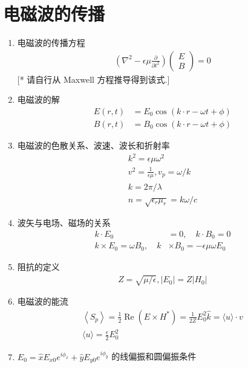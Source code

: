 \documentclass[../../note.tex]{subfiles}
\begin{document}
\section{电磁波的传播}
\begin{enumerate}
	\item 电磁波的传播方程
	\begin{align}
	\left(\nabla^2-\epsilon \mu \frac{\partial}{\partial t^2}\right)\left(\begin{array}{l}
		E \\
		B
	\end{array}\right)=0
	\end{align}
	[* 请自行从 Maxwell 方程推导得到该式.]
		\item 电磁波的解
	\begin{align}
		E(r, t) & ={E}_0 \cos (k \cdot r-\omega t+\phi) \\
		B(r, t) & =B_0 \cos (k \cdot r-\omega t+\phi)
	\end{align}
		\item 电磁波的色散关系、波速、波长和折射率
	\begin{align}
		k^2=\epsilon \mu \omega^2 \\
		v^2=\frac{1}{\epsilon \mu}, v_p=\omega / k \\
		k=2 \pi / \lambda \\
		n=\sqrt{\epsilon_r \mu_r}=k \omega / c
	\end{align}
	
	\item 波矢与电场、磁场的关系
	\begin{align}
		k \cdot {E}_0 & =0, \quad k \cdot B_0=0 \\
		k \times {E}_0=\omega {B}_0, \quad k & \times B_0=-\epsilon \mu \omega {E}_0
	\end{align}
	\item 阻抗的定义
	\begin{align}
	Z=\sqrt{\mu / \epsilon},\left|{E}_0\right|=Z\left|{H}_0\right|
\end{align}
	\item 电磁波的能流
	\begin{align}
		\left\langle{S}_p\right\rangle=\frac{1}{2} \operatorname{Re}\left({E} \times {H}^*\right)=\frac{1}{2 Z} E_0^2 \hat{k}=\langle{u}\rangle \cdot {v} \\
		\langle{u}\rangle=\frac{\epsilon}{2} E_0^2
	\end{align}
	\item $E_0=\hat{x} E_{x 0} e^{i \phi_x}+\hat{y} E_{y 0} e^{i \phi_y}$ 的线偏振和圆偏振条件
	

\end{enumerate}
\end{document}

